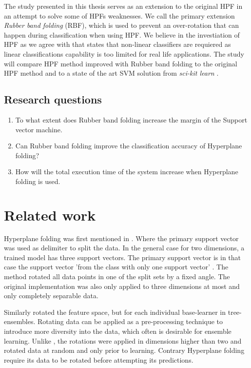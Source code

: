 \documentclass[a4paper,twoside]{bth}
\begin{document}
\par The study presented in this thesis serves as an extension to the original HPF in an attempt to solve some of HPFs weaknesses. We call the primary extension \textit{Rubber band folding} (RBF), which is used to prevent an over-rotation that can happen during classification when using HPF. We believe in the investiation of HPF as we agree with \cite{PWLSVM} that states that non-linear classifiers are requiered as linear classifications capability is too limited for real life applications. The study will compare HPF method improved with Rubber band folding to the original HPF method and to a state of the art SVM solution from \textit{sci-kit learn} \cite{scikit-learn}.

\section{Research questions}

\begin{enumerate}
  \item To what extent does Rubber band folding increase the margin of the Support vector machine.
  \item Can Rubber band folding improve the classification accuracy of Hyperplane folding? 
  \item How will the total execution time of the system increase when Hyperplane folding is used.
\end{enumerate}


\chapter{Related work}
\par Hyperplane folding was first mentioned in  \cite{unpublished}. Where the primary support vector was used as delimiter to split the data. In the general case for two dimensions, a trained model has three support vectors. The primary support vector is in that case the support vector 'from the class with only one support vector' \cite{unpublished}. The method rotated all data points in one of the split sets by a fixed angle. The original implementation was also only applied to three dimensions at most and only completely separable data.

\par Similarly  \cite{PiotrRandomRotation} rotated the feature space, but for each individual base-learner in tree-ensembles. Rotating data can be applied as a pre-processing technique to introduce more diversity into the data, which often is desirable for ensemble learning. Unlike  \cite{unpublished}, the rotations were applied in dimensions higher than two and rotated data at random and only prior to learning. Contrary Hyperplane folding \cite{unpublished} require its data to be rotated before attempting its predictions.
\end{document}
